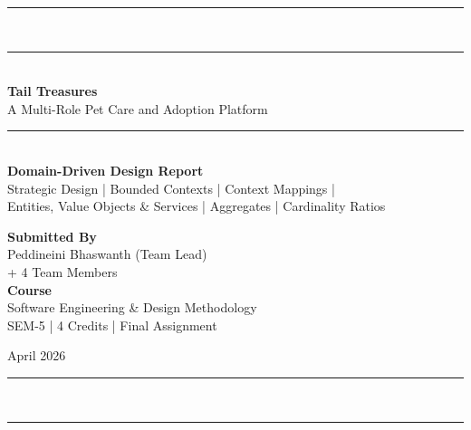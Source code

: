 \documentclass[12pt,a4paper]{article}
\begin{document}
\begin{titlepage}
  \centering
  \vspace*{1.5cm}

  {\color{primary}\rule{\linewidth}{2pt}}\\[0.4cm]
  {\color{accent}\rule{\linewidth}{0.6pt}}\\[1.2cm]

  {\Huge\bfseries\color{primary} Tail Treasures}\\[0.5cm]
  {\Large\color{accent} A Multi-Role Pet Care and Adoption Platform}\\[0.8cm]
  {\color{accent}\rule{0.4\linewidth}{0.6pt}}\\[0.8cm]

  {\large\bfseries\color{darktext}
    Domain-Driven Design Report}\\[0.3cm]
  {\normalsize\color{mutedtext}
    Strategic Design | Bounded Contexts | Context Mappings |\\[0.1cm]
    Entities, Value Objects \& Services | Aggregates | Cardinality Ratios}

  \vspace{1.5cm}

  \begin{tcolorbox}[
    enhanced, colback=ctxBlue!40!white, colframe=primary,
    arc=6pt, boxrule=1pt, width=0.7\linewidth,
    left=12pt, right=12pt, top=10pt, bottom=10pt
  ]
    \centering
    {\small\bfseries\color{primary} Submitted By}\\[6pt]
    {\normalsize\color{darktext} Peddineini Bhaswanth (Team Lead)}\\[2pt]
    {\small\color{mutedtext} + 4 Team Members}\\[6pt]
    {\small\bfseries\color{primary} Course}\\[4pt]
    {\small\color{darktext} Software Engineering \& Design Methodology}\\[2pt]
    {\small\color{mutedtext} SEM-5 | 4 Credits | Final Assignment}
  \end{tcolorbox}

  \vspace{1cm}
  {\small\color{mutedtext} April 2026}

  \vfill
  {\color{accent}\rule{\linewidth}{0.6pt}}\\[0.2cm]
  {\color{primary}\rule{\linewidth}{2pt}}
\end{titlepage}
\end{document}
